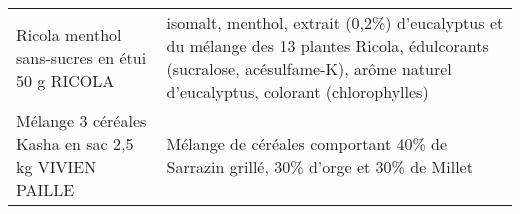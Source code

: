 \begin{longtable}{p{5cm}p{10cm}}
                                                           Ricola menthol sans-sucres en étui 50 g RICOLA &                                                                                                                                                                                                                                                                                                                                                                                                                                                                                                                                                                                                                                                                                                                                                                                                                                                           isomalt, menthol, extrait (0,2\%) d'eucalyptus et du mélange des 13 plantes Ricola, édulcorants (sucralose, acésulfame-K), arôme naturel d'eucalyptus, colorant (chlorophylles) \\
                                                     Mélange 3 céréales Kasha en sac 2,5 kg VIVIEN PAILLE &                                                                                                                                                                                                                                                                                                                                                                                                                                                                                                                                                                                                                                                                                                                                                                                                                                                                                                                                                       Mélange de céréales comportant 40\% de Sarrazin grillé, 30\% d'orge et 30\% de Millet \\

\end{longtable}
